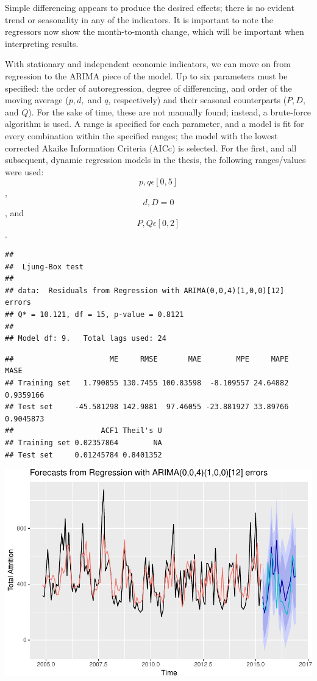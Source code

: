 \documentclass[12pt,letterpaper,toc=flat,oneside]{report}
\theoremstyle{definition}
\theoremstyle{definition}
\theoremstyle{definition}
\theoremstyle{remark}
\begin{document}
Simple differencing appears to produce the desired effects; there is no
evident trend or seasonality in any of the indicators. It is important
to note the regressors now show the month-to-month change, which will be
important when interpreting results.

With stationary and independent economic indicators, we can move on from
regression to the ARIMA piece of the model. Up to six parameters must be
specified: the order of autoregression, degree of differencing, and
order of the moving average (\(p,d,\) and \(q\), respectively) and their
seasonal counterparts (\(P,D,\) and \(Q\)). For the sake of time, these
are not manually found; instead, a brute-force algorithm is used. A
range is specified for each parameter, and a model is fit for every
combination within the specified ranges; the model with the lowest
corrected Akaike Information Criteria (AICc) is selected. For the first,
and all subsequent, dynamic regression models in the thesis, the
following ranges/values were used: \[p,q \epsilon [0,5]\], \[d,D = 0\],
and \[P, Q \epsilon [0,2]\].

\begin{verbatim}
## 
##  Ljung-Box test
## 
## data:  Residuals from Regression with ARIMA(0,0,4)(1,0,0)[12] errors
## Q* = 10.121, df = 15, p-value = 0.8121
## 
## Model df: 9.   Total lags used: 24
\end{verbatim}

\begin{verbatim}
##                      ME     RMSE       MAE        MPE     MAPE      MASE
## Training set   1.790855 130.7455 100.83598  -8.109557 24.64882 0.9359166
## Test set     -45.581298 142.9881  97.46055 -23.881927 33.89766 0.9045873
##                    ACF1 Theil's U
## Training set 0.02357864        NA
## Test set     0.01245784 0.8401352
\end{verbatim}

\includegraphics{elliott-econometric-personnel-retention-18_files/figure-latex/unnamed-chunk-10-1.pdf}
\end{document}
